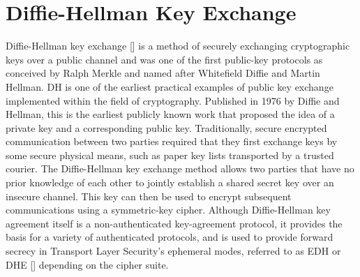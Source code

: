 \section{Diffie-Hellman Key Exchange}\label{sec:diffie-hellman-key-exchange}

Diffie-Hellman key exchange [\cite{li2010research}] is a method of securely exchanging cryptographic keys over a public channel
and was one of the first public-key protocols
as conceived by Ralph Merkle and named after Whitefield Diffie and Martin Hellman.
DH is one of the earliest practical examples of public key exchange implemented within the field of cryptography.
Published in 1976 by Diffie and Hellman, this is the earliest publicly known work that proposed the idea of a private
key and a corresponding public key.
Traditionally, secure encrypted communication between two parties required that they first exchange keys by some secure physical means,
such as paper key lists transported by a trusted courier.
The Diffie-Hellman key exchange method allows two parties that have no prior knowledge of
each other to jointly establish a shared secret key over an insecure channel.
This key can then be used to encrypt subsequent communications using a symmetric-key cipher.
Although Diffie-Hellman key agreement itself is a non-authenticated key-agreement protocol, it provides the basis for a
variety of authenticated protocols, and is used to provide forward secrecy in Transport Layer Security's ephemeral modes,
referred to as EDH or DHE [\cite{ahirwal2013elliptic}] depending on the cipher suite.

